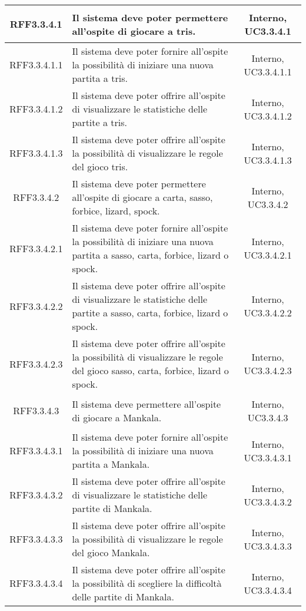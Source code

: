 \begin{longtable}{|c|>{\centering}m{7cm}|c|}
\hypertarget{RFF3.3.4.1}{RFF3.3.4.1} & Il sistema deve poter permettere all'ospite di giocare a tris. & Interno, UC3.3.4.1\\ \hline
\hypertarget{RFF3.3.4.1.1}{RFF3.3.4.1.1} & Il sistema deve poter fornire all'ospite la possibilità di iniziare una nuova partita a tris. & Interno, UC3.3.4.1.1\\ \hline
\hypertarget{RFF3.3.4.1.2}{RFF3.3.4.1.2} & Il sistema deve poter offrire all'ospite di visualizzare le statistiche delle partite a tris. & Interno, UC3.3.4.1.2\\ \hline
\hypertarget{RFF3.3.4.1.3}{RFF3.3.4.1.3} & Il sistema deve poter offrire all'ospite la possibilità di visualizzare le regole del gioco tris. & Interno, UC3.3.4.1.3\\ \hline
\hypertarget{RFF3.3.4.2}{RFF3.3.4.2} & Il sistema deve poter permettere all'ospite di giocare a carta, sasso, forbice, lizard, spock. & Interno, UC3.3.4.2\\ \hline
\hypertarget{RFF3.3.4.2.1}{RFF3.3.4.2.1} & Il sistema deve poter fornire all'ospite la possibilità di iniziare una nuova partita a sasso, carta, forbice, lizard o spock. & Interno, UC3.3.4.2.1\\ \hline
\hypertarget{RFF3.3.4.2.2}{RFF3.3.4.2.2} & Il sistema deve poter offrire all'ospite di visualizzare le statistiche delle partite a sasso, carta, forbice, lizard o spock. & Interno, UC3.3.4.2.2\\ \hline
\hypertarget{RFF3.3.4.2.3}{RFF3.3.4.2.3} & Il sistema deve poter offrire all'ospite la possibilità di visualizzare le regole del gioco sasso, carta, forbice, lizard o spock. & Interno, UC3.3.4.2.3\\ \hline
\hypertarget{RFF3.3.4.3}{RFF3.3.4.3} & Il sistema deve permettere all'ospite di giocare a Mankala. & Interno, UC3.3.4.3\\ \hline
\hypertarget{RFF3.3.4.3.1}{RFF3.3.4.3.1} & Il sistema deve poter fornire all'ospite la possibilità di iniziare una nuova partita a Mankala. & Interno, UC3.3.4.3.1\\ \hline
\hypertarget{RFF3.3.4.3.2}{RFF3.3.4.3.2} & Il sistema deve poter offrire all'ospite di visualizzare le statistiche delle partite di Mankala. & Interno, UC3.3.4.3.2\\ \hline
\hypertarget{RFF3.3.4.3.3}{RFF3.3.4.3.3} & Il sistema deve poter offrire all'ospite la possibilità di visualizzare le regole del gioco Mankala. & Interno, UC3.3.4.3.3\\ \hline
\hypertarget{RFF3.3.4.3.4}{RFF3.3.4.3.4} & Il sistema deve poter offrire all'ospite la possibilità di scegliere la difficoltà delle partite di Mankala. & Interno, UC3.3.4.3.4\\ \hline

\end{longtable}

